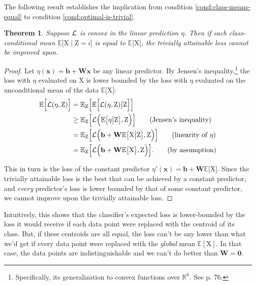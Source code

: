 \documentclass{article}
\theoremstyle{plain}
\newtheorem{theorem}{Theorem}[section]
\theoremstyle{remark}
\newcommand{\E}{\mathbb E}
\theoremstyle{plain}
\theoremstyle{TheoremNum}
\newcommand{\rv}[1]{{\mathrm{#1}}}
\newcommand{\loss}{\color{black} \mathcal{L}}
\begin{document}
The following result establishes the implication from condition \ref{cond:class-means-equal} to condition \ref{cond:optimal-is-trivial}.

\begin{theorem}\label{equality-sufficient}
    Suppose $\loss$ is convex in the linear prediction $\eta$. Then if each class-conditional mean $\E\big[\rv X\mid \rv Z = i\big]$ is equal to $\E\big[\rv X\big]$, the trivially attainable loss cannot be improved upon.
\end{theorem}

\begin{proof}
Let $\eta(\mathbf{x}) = \mathbf{b} + \mathbf{Wx}$ be any linear predictor. By Jensen's inequality,\footnote{Specifically, its generalization to convex functions over $\mathbb R^k$. See \citep{ferguson1967statistics} p. 76.} the loss with $\eta$ evaluated on $\rv X$ is lower bounded by the loss with $\eta$ evaluated on the unconditional mean of the data $\E\big[\rv X\big]$:
\begin{align*}
    \E \Big[\loss(\eta, \rv Z)\Big]
    = \mathbb E_{\rv Z} & \Big[ \E \Big[\loss(\eta, \rv Z) \big| \rv Z \Big] \Big] \\
    \ge \mathbb E_{\rv Z} & \Big[ \loss\Big( \E \big[ \eta \big| \rv Z \big], \rv Z \Big) \Big] \tag{Jensen's inequality} \\
    = \mathbb E_{\rv Z} & \Big[ \loss\Big( \mathbf b + \mathbf W \E \big[ \rv X \big| \rv Z \big], \rv Z \Big) \Big] \tag{linearity of $\eta$} \\
    = \mathbb E_{\rv Z} & \Big[ \loss\Big( \mathbf b + \mathbf W \E \big[ \rv X \big], \rv Z \Big) \Big]. \tag{by assumption}
\end{align*}

This in turn is the loss of the constant predictor $\eta'(\mathbf{x}) = \mathbf b + \mathbf W \E \big[ \rv X \big]$. Since the trivially attainable loss is the best that can be achieved by a constant predictor, and \textit{every} predictor's loss is lower bounded by that of some constant predictor, we cannot improve upon the trivially attainable loss.
\end{proof}

Intuitively, this shows that the classifier's expected loss is lower-bounded by the loss it would receive if each data point were replaced with the centroid of its class. But, if these centroids are all equal, the loss can't be any lower than what we'd get if every data point were replaced with the \emph{global} mean $\E[\rv X]$. In that case, the data points are indistinguishable and we can't do better than $\mathbf W = \mathbf 0$.
\end{document}

